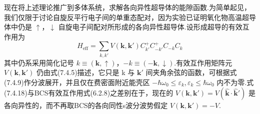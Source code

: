 现在将上述理论推广到多体系统，求解各向异性超导体的能隙函数.为简单起见，我们仅限于讨论自旋反平行电子间的单重态配对，因为实验已证明氧化物高温超导体中仍是 $\uparrow$，$\downarrow$ 自旋电子间配对所形成的各向异性超导体.设形成超导的有效互作用为
\begin{equation}
  H_{\mathrm{eff}}=\sum_{k,k'}V\left(\boldsymbol{k},\boldsymbol{k}'\right)C^{+}_{k'}C^{+}_{-k'}C_{-k}C_{k}
\end{equation}
其中仍系采用简化记号 $k\equiv\left(\boldsymbol{k},\uparrow\right)$，$-k\equiv\left(-\boldsymbol{k},\downarrow\right)$.有效互作用矩阵元 $V\left(\boldsymbol{k},\boldsymbol{k}'\right)$ 仍由式(7.4.5)描述，它只是 k 与 $\boldsymbol{k}'$ 间夹角余弦的函数，可根据式(7.4.9)作分波展开，并且仅在费密面附近能壳区 $-\hbar\omega_{0}\leqslant\varepsilon_{k},\varepsilon_{k}\leqslant\hbar\omega_{0}$ 内不为零.式(7.4.18)与BCS有效互作用式(6.2.8)之差别在于，现在的 $V\left(\boldsymbol{k},\boldsymbol{k}'\right)=V\left(\hat{\boldsymbol{k}}\cdot\hat{\boldsymbol{k}}'\right)$ 是各向异性的，而不再取BCS的各向同性s波分波势假定 $V\left(\boldsymbol{k},\boldsymbol{k}'\right)=-V$.

